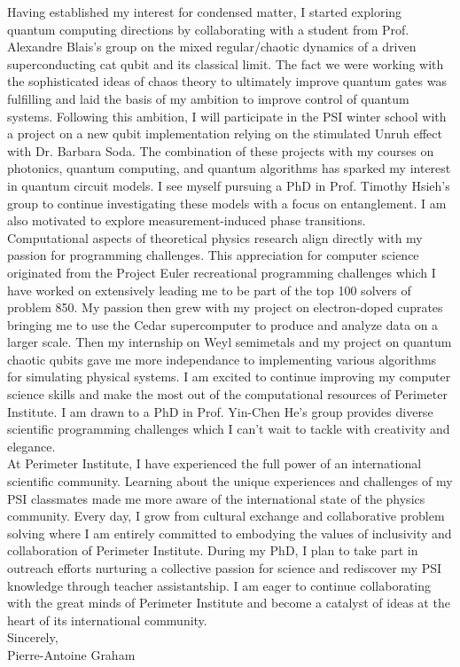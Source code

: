 \documentclass[12pt]{article}
\begin{document}
Having established my interest for condensed matter, I started exploring quantum computing directions by collaborating with a student from Prof. Alexandre Blais's group on the mixed regular/chaotic dynamics of a driven superconducting cat qubit and its classical limit. The fact we were working with the sophisticated ideas of chaos theory to ultimately improve quantum gates was fulfilling and laid the basis of my ambition to improve control of quantum systems. Following this ambition, I will participate in the PSI winter school with a project on a new qubit implementation relying on the stimulated Unruh effect with Dr. Barbara Soda. The combination of these projects with my courses on photonics, quantum computing, and quantum algorithms has sparked my interest in quantum circuit models. I see myself pursuing a PhD in Prof. Timothy Hsieh's group to continue investigating these models with a focus on entanglement. I am also motivated to explore measurement-induced phase transitions.\\

Computational aspects of theoretical physics research align directly with my passion for programming challenges. This appreciation for computer science originated from the Project Euler recreational programming challenges which I have worked on extensively leading me to be part of the top 100 solvers of problem 850. My passion then grew with my project on electron-doped cuprates bringing me to use the Cedar supercomputer to produce and analyze data on a larger scale. Then my internship on Weyl semimetals and my project on quantum chaotic qubits gave me more independance to implementing various algorithms for simulating physical systems. I am excited to continue improving my computer science skills and make the most out of the computational resources of Perimeter Institute. I am drawn to a PhD in Prof. Yin-Chen He's group provides diverse scientific programming challenges which I can't wait to tackle with creativity and elegance.\\

At Perimeter Institute, I have experienced the full power of an international scientific community. Learning about the unique experiences and challenges of my PSI classmates made me more aware of the international state of the physics community. Every day, I grow from cultural exchange and collaborative problem solving where I am entirely committed to embodying the values of inclusivity and collaboration of Perimeter Institute. During my PhD, I plan to take part in outreach efforts nurturing a collective passion for science and rediscover my PSI knowledge through teacher assistantship. I am eager to continue collaborating with the great minds of Perimeter Institute and become a catalyst of ideas at the heart of its international community.\\

Sincerely,\\
Pierre-Antoine Graham
\end{document}
